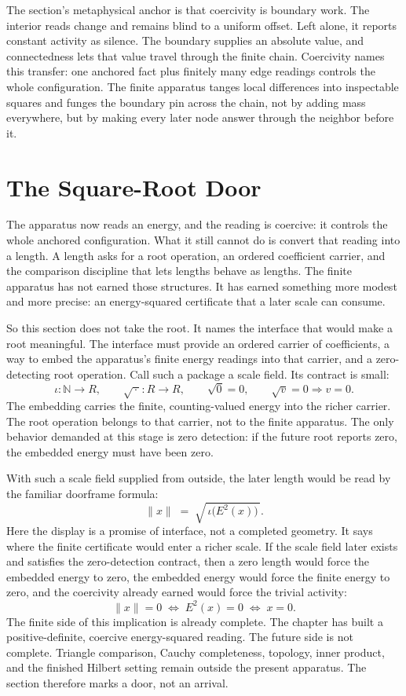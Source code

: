The section's metaphysical anchor is that coercivity is boundary work. The
interior reads change and remains blind to a uniform offset. Left alone, it
reports constant activity as silence. The boundary supplies an absolute value,
and connectedness lets that value travel through the finite chain. Coercivity
names this transfer: one anchored fact plus finitely many edge readings controls
the whole configuration. The finite apparatus tanges local differences into
inspectable squares and funges the boundary pin across the chain, not by adding
mass everywhere, but by making every later node answer through the neighbor
before it.

\section{The Square-Root Door}

The apparatus now reads an energy, and the reading is coercive: it controls the
whole anchored configuration. What it still cannot do is convert that reading
into a length. A length asks for a root operation, an ordered coefficient
carrier, and the comparison discipline that lets lengths behave as lengths. The
finite apparatus has not earned those structures. It has earned something more
modest and more precise: an energy-squared certificate that a later scale can
consume.

So this section does not take the root. It names the interface that would make a
root meaningful. The interface must provide an ordered carrier of coefficients,
a way to embed the apparatus's finite energy readings into that carrier, and a
zero-detecting root operation. Call such a package a scale field. Its contract is
small:
\[
  \iota : \mathbb{N} \to R,
  \qquad
  \sqrt{\,\cdot\,} : R \to R,
  \qquad
  \sqrt{0} = 0,
  \qquad
  \sqrt{v} = 0 \Rightarrow v = 0.
\]
The embedding carries the finite, counting-valued energy into the richer
carrier. The root operation belongs to that carrier, not to the finite apparatus.
The only behavior demanded at this stage is zero detection: if the future root
reports zero, the embedded energy must have been zero.

With such a scale field supplied from outside, the later length would be read by
the familiar doorframe formula:
\[
  \lVert x \rVert \;=\; \sqrt{\,\iota\big(E^2(x)\big)\,}.
\]
Here the display is a promise of interface, not a completed geometry. It says
where the finite certificate would enter a richer scale. If the scale field later
exists and satisfies the zero-detection contract, then a zero length would force
the embedded energy to zero, the embedded energy would force the finite energy to
zero, and the coercivity already earned would force the trivial activity:
\[
  \lVert x \rVert = 0
  \;\Longleftrightarrow\;
  E^2(x) = 0
  \;\Longleftrightarrow\;
  x = 0.
\]
The finite side of this implication is already complete. The chapter has built a
positive-definite, coercive energy-squared reading. The future side is not
complete. Triangle comparison, Cauchy completeness, topology, inner product, and
the finished Hilbert setting remain outside the present apparatus. The section
therefore marks a door, not an arrival.

